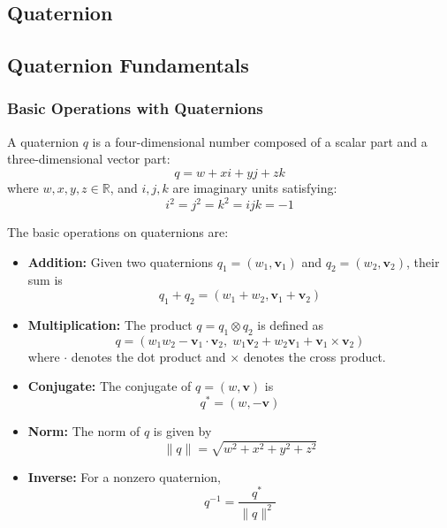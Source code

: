 \documentclass{iutbscthesis}
\begin{document}
\begin{appendices}

\chapter{Quaternion} 

\section{Quaternion Fundamentals}

\subsection{Basic Operations with Quaternions}

A quaternion $q$ is a four-dimensional number composed of a scalar part and a three-dimensional vector part:
\[
q = w + xi + yj + zk
\]
where $w, x, y, z \in \mathbb{R}$, and $i, j, k$ are imaginary units satisfying:
\[
i^2 = j^2 = k^2 = ijk = -1
\]

The basic operations on quaternions are:

\begin{itemize}
    \item \textbf{Addition:} Given two quaternions $q_1 = (w_1, \mathbf{v}_1)$ and $q_2 = (w_2, \mathbf{v}_2)$, their sum is
    \[
    q_1 + q_2 = (w_1 + w_2, \mathbf{v}_1 + \mathbf{v}_2)
    \]
    
    \item \textbf{Multiplication:} The product $q = q_1 \otimes q_2$ is defined as
    \[
    q = (w_1w_2 - \mathbf{v}_1 \cdot \mathbf{v}_2,\; w_1\mathbf{v}_2 + w_2\mathbf{v}_1 + \mathbf{v}_1 \times \mathbf{v}_2)
    \]
    where $\cdot$ denotes the dot product and $\times$ denotes the cross product.
    
    \item \textbf{Conjugate:} The conjugate of $q = (w, \mathbf{v})$ is
    \[
    q^* = (w, -\mathbf{v})
    \]
    
    \item \textbf{Norm:} The norm of $q$ is given by
    \[
    \|q\| = \sqrt{w^2 + x^2 + y^2 + z^2}
    \]
    
    \item \textbf{Inverse:} For a nonzero quaternion,
    \[
    q^{-1} = \frac{q^*}{\|q\|^2}
    \]
\end{itemize}


\end{appendices}
\end{document}
